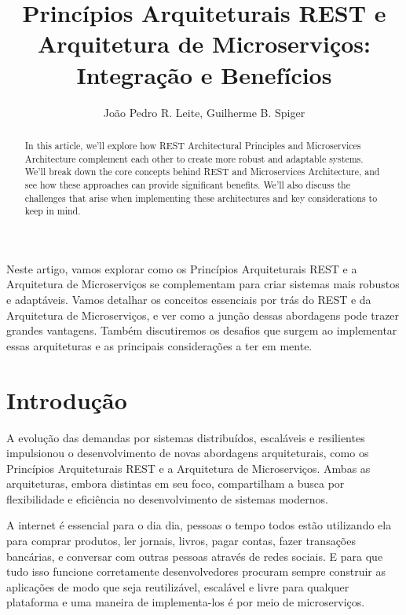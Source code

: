 \documentclass[12pt]{article}
\title{Princípios Arquiteturais REST e Arquitetura de Microserviços: Integração e Benefícios}
\author{João Pedro R. Leite\inst{1}, Guilherme B. Spiger\inst{1}}
\begin{document}
 
	
	\maketitle
	
	\begin{abstract}
		In this article, we’ll explore how REST Architectural Principles and Microservices Architecture complement each other to create more robust and adaptable systems. We’ll break down the core concepts behind REST and Microservices Architecture, and see how these approaches can provide significant benefits. We’ll also discuss the challenges that arise when implementing these architectures and key considerations to keep in mind.
	\end{abstract}
	
	\begin{resumo}
		Neste artigo, vamos explorar como os Princípios Arquiteturais REST e a Arquitetura de Microserviços se complementam para criar sistemas mais robustos e adaptáveis. Vamos detalhar os conceitos essenciais por trás do REST e da Arquitetura de Microserviços, e ver como a junção dessas abordagens pode trazer grandes vantagens. Também discutiremos os desafios que surgem ao implementar essas arquiteturas e as principais considerações a ter em mente.
	\end{resumo}
	
	\section{Introdução}
	
	A evolução das demandas por sistemas distribuídos, escaláveis e resilientes impulsionou o desenvolvimento de novas abordagens arquiteturais, como os Princípios Arquiteturais REST e a Arquitetura de Microserviços. Ambas as arquiteturas, embora distintas em seu foco, compartilham a busca por flexibilidade e eficiência no desenvolvimento de sistemas modernos.
	
	A internet é essencial para o dia dia, pessoas o tempo todos estão utilizando ela para comprar produtos, ler jornais, livros, pagar contas, fazer transações bancárias, e conversar com outras pessoas através de redes sociais. E para que tudo isso funcione corretamente desenvolvedores procuram sempre construir as aplicações de modo que seja reutilizável, escalável e livre para qualquer plataforma e uma maneira de implementa-los é por meio de microserviços.
	
\end{document}
